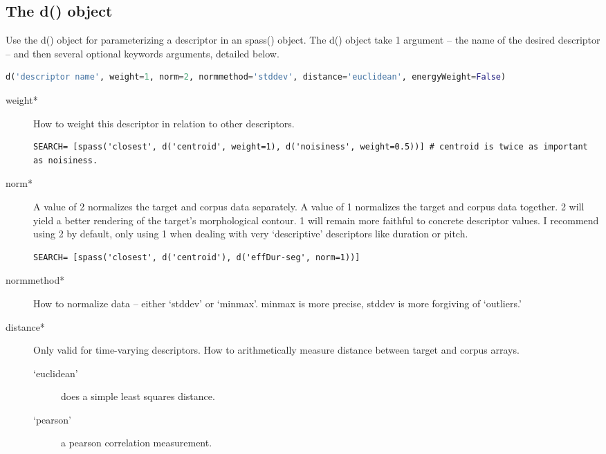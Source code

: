 \documentclass{article}
\begin{document}
\begin{spacing}{1.2}
\section{The d() object}
Use the d() object for parameterizing a descriptor in an spass() object.  The d() object take 1 argument -- the name of the desired descriptor --  and then several optional keywords arguments, detailed below.

 \begin{lstlisting}[language=python]
d('descriptor name', weight=1, norm=2, normmethod='stddev', distance='euclidean', energyWeight=False)
\end{lstlisting}
 
\begin{description}
\item[weight*] How to weight this descriptor in relation to other descriptors.

\begin{lstlisting}
SEARCH= [spass('closest', d('centroid', weight=1), d('noisiness', weight=0.5))] # centroid is twice as important as noisiness.
\end{lstlisting}

\item[norm*] A value of 2 normalizes the target and corpus data separately.  A value of 1 normalizes the target and corpus data together.  2 will yield a better rendering of the target's morphological contour.  1 will remain more faithful to concrete descriptor values.  I recommend using 2 by default, only using 1 when dealing with very `descriptive' descriptors like duration or pitch.

\begin{lstlisting}
SEARCH= [spass('closest', d('centroid'), d('effDur-seg', norm=1))]
\end{lstlisting}

\item[normmethod*] How to normalize data -- either `stddev' or `minmax'.  minmax is more precise, stddev is more forgiving of `outliers.'

\item[distance*] Only valid for time-varying descriptors.  How to arithmetically measure distance between target and corpus arrays.  
\begin{description}
\item[`euclidean'] does a simple least squares distance.
\item[`pearson'] a pearson correlation measurement.
\end{description}


\end{description}
\end{spacing}
\end{document}
